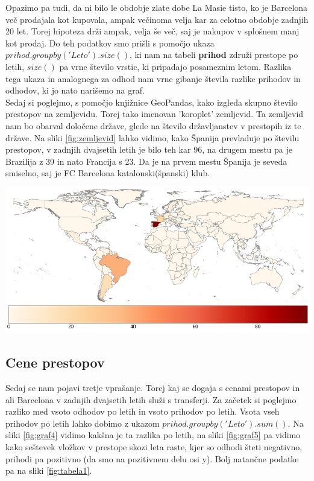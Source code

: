 \documentclass[a4paper, 12pt]{article}
\begin{document}
Opazimo pa tudi, da ni bilo le obdobje zlate dobe La Masie tisto, ko je Barcelona več prodajala kot kupovala, ampak večinoma velja kar za celotno obdobje zadnjih 20 let. Torej hipoteza drži ampak, velja še več, saj je nakupov v splošnem manj kot prodaj.
Do teh podatkov smo prišli s pomočjo ukaza $prihod.groupby('Leto').size()$, ki nam na tabeli \textbf{prihod} združi prestope po letih, $size()$ pa vrne število vrstic, ki pripadajo posameznim letom. 
Razlika tega ukaza in analognega za odhod nam vrne gibanje števila razlike prihodov in odhodov, ki jo nato narišemo na graf.
\medskip \\ 
Sedaj si poglejmo, s pomočjo knjižnice GeoPandas, kako izgleda skupno število prestopov na zemljevidu. Torej tako imenovan 'koroplet' zemljevid. Ta zemljevid nam bo obarval določene države, glede na število državljanstev v prestopih iz te države.
Na sliki \ref{fig:zemljevid} lahko vidimo, kako Španija prevladuje po številu prestopov, v zadnjih dvajsetih letih je bilo teh kar 96, na drugem mestu pa je Brazilija z 39 in nato Francija s 23. Da je na prvem mestu Španija je seveda smiselno, saj je FC Barcelona katalonski(španski) klub.

\includegraphics[width=1\textwidth]{zemljevid}
\label{fig:zemljevid}

\subsection{Cene prestopov}
Sedaj se nam pojavi tretje vprašanje. Torej kaj se dogaja s cenami prestopov in ali Barcelona v zadnjih dvajsetih letih služi s transferji. 
Za začetek si poglejmo razliko med vsoto odhodov po letih in vsoto prihodov po letih. Vsota vseh prihodov po letih lahko dobimo z ukazom $prihod.groupby('Leto').sum()$. Na sliki \ref{fig:graf4} vidimo kakšna je ta razlika po letih, na sliki \ref{fig:graf5} pa vidimo kako seštevek vložkov v prestope skozi leta raste, kjer so odhodi šteti negativno, prihodi pa pozitivno (da smo na pozitivnem delu osi y). Bolj natančne podatke pa na sliki \ref{fig:tabela1}.
\end{document}
